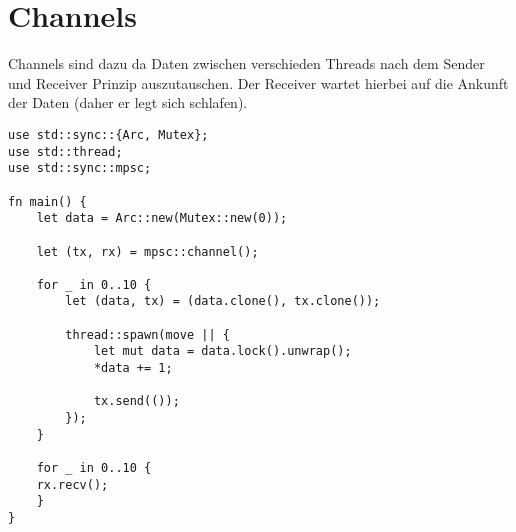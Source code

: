 \section{Channels}

Channels sind dazu da Daten zwischen verschieden Threads nach dem Sender und Receiver Prinzip auszutauschen. Der Receiver wartet hierbei auf die Ankunft der Daten (daher er legt sich schlafen).

\begin{lstlisting}
use std::sync::{Arc, Mutex};
use std::thread;
use std::sync::mpsc;

fn main() {
	let data = Arc::new(Mutex::new(0));

	let (tx, rx) = mpsc::channel();

	for _ in 0..10 {
		let (data, tx) = (data.clone(), tx.clone());

		thread::spawn(move || {
			let mut data = data.lock().unwrap();
			*data += 1;

			tx.send(());
		});
	}

	for _ in 0..10 {
	rx.recv();
	}
}
\end{lstlisting}